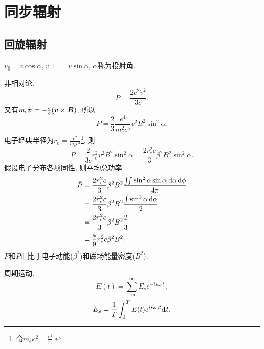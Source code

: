 \chapter{同步辐射}

\section{回旋辐射}

$v_\parallel=v\cos\alpha$, $v\perp=v\sin\alpha$, $\alpha$称为投射角.

非相对论,
\begin{equation}
    P=\frac{2e^2\dot{v}^2}{3c}.
\end{equation}
又有$m_e\dot{\boldsymbol{v}}=-\frac{e}{c}(\boldsymbol{v}\times\boldsymbol{B})$, 所以
\begin{equation}
    P=\frac{2}{3}\frac{e^4}{m_e^2c^5}v^2B^2\sin^2\alpha.
\end{equation}
电子经典半径为$r_e=\frac{e^2}{m_ec^2}$\footnote{令$m_ec^2=\frac{e^2}{r_e}$.}, 则
\begin{equation}
    P=\frac{2}{3c}r_e^2v^2B^2\sin^2\alpha=\frac{2r_e^2c}{3}\beta^2B^2\sin^2\alpha.
\end{equation}
假设电子分布各项同性, 则平均总功率
\begin{align}
    \bar{P}&=\frac{2r_e^2c}{3}\beta^2B^2\frac{\iint\sin^2\alpha\sin\alpha\,\mathrm{d}\alpha\,\mathrm{d}\phi}{4\pi}\\
    &=\frac{2r_e^2c}{3}\beta^2B^2\frac{\int\sin^3\alpha\,\mathrm{d}\alpha}{2}\\
    &=\frac{2r_e^2c}{3}\beta^2B^2\frac{2}{3}\\
    &=\frac{4}{9}r_e^2c\beta^2B^2.
\end{align}
$P$和$\bar{P}$正比于电子动能($\beta^2$)和磁场能量密度($B^2$).

周期运动,
\begin{equation}
    E(t)=\sum_{-\infty}^{\infty} E_se^{-is\omega_0 t},
\end{equation}
\begin{equation}
    E_s=\frac{1}{T}\int_0^T E(t)e^{is\omega_0 t}\mathrm{d} t.
\end{equation}

